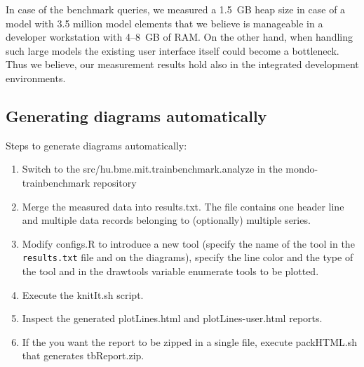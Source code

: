 In case of the benchmark queries, we measured a 1.5~GB heap size in case of a
model with 3.5 million model elements that we believe is manageable in a developer
workstation with 4--8~GB of RAM. On the other hand, when handling such large
models the existing user interface itself could become a bottleneck. Thus we
believe, our measurement results hold also in the integrated development
environments.


\subsection{Generating diagrams automatically}
Steps to generate diagrams automatically:
\begin{enumerate}
  \item Switch to the \textsf{src/hu.bme.mit.trainbenchmark.analyze} in the mondo-trainbenchmark repository
  \item Merge the measured data into \textsf{results.txt}. The file contains one header line and multiple data records belonging to (optionally) multiple series.
  \item Modify \textsf{configs.R} to introduce a new tool (specify the name of the tool in the \texttt{results.txt} file and on the diagrams), specify the line color and the type of the tool and in the \textsf{drawtools} variable enumerate tools to be plotted.
  \item Execute the \textsf{knitIt.sh} script.
  \item Inspect the generated \textsf{plotLines.html} and \textsf{plotLines-user.html} reports.
  \item If the you want the report to be zipped in a single file, execute \textsf{packHTML.sh} that generates \textsf{tbReport.zip}.
\end{enumerate}
